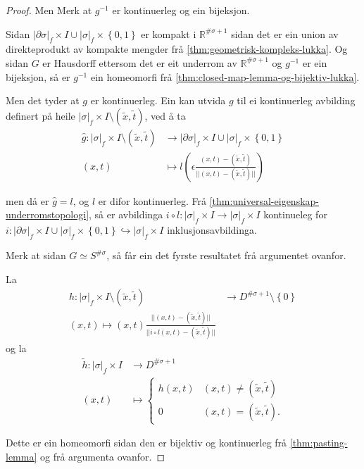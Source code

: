 \documentclass[a4paper, 12pt, norsk]{article}
\theoremstyle{plain}
\theoremstyle{definition}
\newcommand{\Rb}{\mathbb{R}}
\newcommand{\union}{ \mathop{\cup}\limits }
\newcommand{\gr}[1]{ \lvert #1 \rvert } %
\newcommand{\set}[1]{ \left\{ #1 \right\} } %
\newcommand{\tuple}[1]{ \left( #1 \right) } %
\begin{document}
\begin{proof}
	Men Merk at  \( g^{-1} \) er kontinuerleg og ein bijeksjon.
	
	Sidan \( \gr{\partial\sigma}_f \times I \union \gr{\sigma}_f \times \set{0, 1} \) er kompakt i \( \Rb^{\#\sigma+1} \) sidan det er ein union av direkteprodukt av kompakte mengder frå \autoref{thm:geometrisk-kompleks-lukka}. Og sidan \( G \) er Hausdorff ettersom det er eit underrom av \( \Rb^{\#\sigma+1} \) og \( g^{-1} \) er ein bijeksjon, så er \( g^{-1} \) ein homeomorfi frå \autoref{thm:closed-map-lemma-og-bijektiv-lukka}.
	
	Men det tyder at \( g \) er kontinuerleg. Ein kan utvida \( g \) til ei kontinuerleg avbilding definert på heile \( \gr{\sigma}_f \times I \setminus \tuple{\tilde{x}, \tilde{t}} \), ved å ta
	\begin{align*}
		\hat{g} : \gr{\sigma}_f \times I \setminus \tuple{\tilde{x}, \tilde{t}} &\to \gr{\partial\sigma}_f \times I \union \gr{\sigma}_f \times \set{0, 1} \\
		(x,t) &\mapsto l\tuple{\epsilon\frac{(x,t)-\tuple{\tilde{x}, \tilde{t}}}{||(x,t) - \tuple{\tilde{x}, \tilde{t}}||}}
	\end{align*}

	men då er \( \hat{g} = l \), og \( l \) er difor kontinuerleg. Frå \autoref{thm:universal-eigenskap-underromstopologi}, så er avbildinga \( i \circ l : \gr{\sigma}_f \times I \to \gr{\sigma}_f \times I \) kontinueleg for \( i: \gr{\partial\sigma}_f \times I \union \gr{\sigma}_f \times \set{0, 1} \hookrightarrow \gr{\sigma}_f \times I \) inklusjonsavbildinga.
	
	Merk at sidan \( G \simeq S^{\#\sigma} \), så får ein det fyrste resultatet frå argumentet ovanfor.

	La
	\begin{align*}
		h: \gr{\sigma}_f \times I \setminus \tuple{\tilde{x}, \tilde{t}} &\to D^{\#\sigma+1} \setminus \set{0} \\
		(x, t) \mapsto \tuple{x, t}\frac{||(x,t) - (\tilde{x}, \tilde{t})||}{||i\circ l(x,t)-(\tilde{x}, \tilde{t})||}
	\end{align*}
	og la
	\begin{align*}
		\tilde{h}: \gr{\sigma}_f \times I &\to D^{\#\sigma+1} \\
		(x,t) &\mapsto
		\begin{cases}
			h(x,t) & (x, t) \neq (\tilde{x}, \tilde{t}) \\
			0 & (x, t) = (\tilde{x}, \tilde{t}).
		\end{cases}
	\end{align*}

	Dette er ein homeomorfi sidan den er bijektiv og kontinuerleg frå \autoref{thm:pasting-lemma} og frå argumenta ovanfor.
\end{proof}
\end{document}
